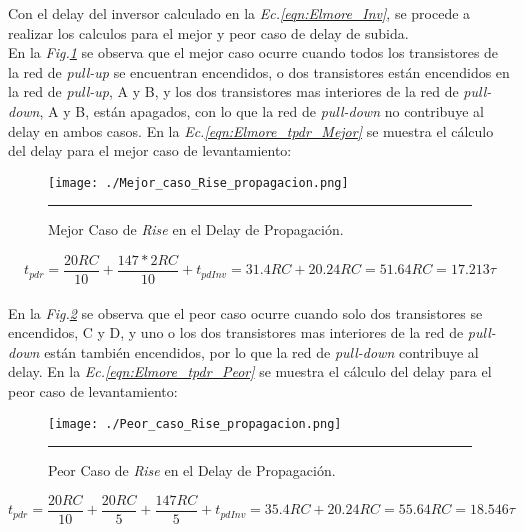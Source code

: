 \documentclass[12pt,a4paper]{article} %
\begin{document}
Con el delay del inversor calculado en la \textit{Ec.\ref{eqn:Elmore_Inv}}, se procede a realizar los calculos para el mejor y peor caso de delay de subida.\\

En la \textit{Fig.\ref{fig:Mejor_caso_Rise_propagacion}} se observa que el mejor caso ocurre cuando todos los transistores de la red de \textit{pull-up} se encuentran encendidos, o dos transistores están encendidos en la red de \textit{pull-up}, A y B, y los dos transistores mas interiores de la red de \textit{pull-down}, A y B, están apagados, con lo que la red de \textit{pull-down} no contribuye al delay en ambos casos. En la \textit{Ec.\ref{eqn:Elmore_tpdr_Mejor}} se muestra el cálculo del delay para el mejor caso de levantamiento:\\

\begin{figure}[htbp]
  \centering
    \texttt{[image: ./Mejor\_caso\_Rise\_propagacion.png]}
    \rule{35em}{0.5pt}
  \caption[IdealvsSim]{Mejor Caso de \textit{Rise} en el Delay de Propagación.}
  \label{fig:Mejor_caso_Rise_propagacion}
\end{figure}

\begin{equation}\label{eqn:Elmore_tpdr_Mejor}
t_{pdr} = \frac{20RC}{10} + \frac{147*2RC}{10} + t_{pdInv}= 31.4RC + 20.24RC = 51.64RC = 17.213\tau
\end{equation}\\

En la \textit{Fig.\ref{fig:Peor_caso_Rise_propagacion}} se observa que el peor caso ocurre cuando solo dos transistores se encendidos, C y D, y uno o los dos transistores mas interiores de la red de \textit{pull-down} están también encendidos, por lo que la red de \textit{pull-down} contribuye al delay. En la \textit{Ec.\ref{eqn:Elmore_tpdr_Peor}} se muestra el cálculo del delay para el peor caso de levantamiento:\\

\begin{figure}[htbp]
  \centering
    \texttt{[image: ./Peor\_caso\_Rise\_propagacion.png]}
    \rule{35em}{0.5pt}
  \caption[IdealvsSim]{Peor Caso de \textit{Rise} en el Delay de Propagación.}
  \label{fig:Peor_caso_Rise_propagacion}
\end{figure}

\begin{equation}\label{eqn:Elmore_tpdr_Peor}
t_{pdr} = \frac{20RC}{10}+\frac{20RC}{5}+\frac{147RC}{5}+t_{pdInv}= 35.4RC + 20.24RC = 55.64RC = 18.546\tau
\end{equation}\\
\end{document}
